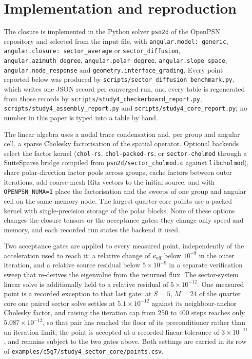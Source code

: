 \documentclass[11pt,a4paper]{article}
\newcommand{\keff}{\kappa_{\mathrm{eff}}}
\begin{document}
\section{Implementation and reproduction}
\label{sec:implementation}

The closure is implemented in the Python solver \texttt{psn2d} of the OpenPSN
repository and selected from the input file, with
\texttt{angular.model:\ generic}, \texttt{angular.closure:\ sector\_average} or
\texttt{sector\_diffusion}, \texttt{angular.azimuth\_degree},
\texttt{angular.polar\_degree}, \texttt{angular.slope\_space},
\texttt{angular.node\_response} and \texttt{geometry.interface\_grading}. Every point
reported below was produced by
\texttt{scripts/sector\_diffusion\_benchmark.py}, which writes one JSON record per
converged run, and every table is regenerated from those records by
\texttt{scripts/\allowbreak study4\_\allowbreak checkerboard\_\allowbreak report.py},
\texttt{scripts/\allowbreak study4\_\allowbreak assembly\_\allowbreak report.py} and
\texttt{scripts/\allowbreak study4\_\allowbreak core\_\allowbreak report.py}; no number
in this paper is typed into a table by hand.

The linear algebra uses a nodal trace condensation and, per group and angular cell, a
sparse Cholesky factorisation of the spatial operator. Optional backends select the
factor kernel (\texttt{chol-rs}, \texttt{chol-packed-rs}, or \texttt{sector-cholmod}
through a SuiteSparse bridge compiled from
\texttt{psn2d/sector\_cholmod.c} against \texttt{libcholmod}), share polar-direction
factor pools across groups, cache factors between outer iterations, add coarse-mesh
Ritz vectors to the initial source, and with \texttt{OPENPSN\_NUMA=1} place the
factorisation and the
sweeps of one group and angular cell on the same memory node. The largest quarter-core
points use a packed kernel with single-precision storage of the polar blocks. None of
these options changes the closure tensors or the acceptance gates: they change only
speed and memory, and each recorded run states the backend it used.

Two acceptance gates are applied to every measured point, independently of the
acceleration used to reach it: a relative change of $\keff$ below $10^{-9}$ in the
outer iteration, and a relative source residual below $5\times10^{-9}$ in a separate
verification sweep that re-derives the eigenvalue from the returned flux. The
sector-system linear solve is additionally held to a relative residual of
$5\times10^{-12}$. One measured point is a recorded exception to that last gate: at
$S{=}5$, $M{=}24$ of the quarter core one paired sector solve settles at
$5.1\times10^{-12}$ against its neighbour-anchor Cholesky factor, and raising the
iteration cap from 250 to 400 steps reaches only $5.087\times10^{-12}$, so that pair has
reached the floor of its preconditioner rather than an iteration limit; the point is
accepted at a recorded linear tolerance of $3\times10^{-11}$, and remains subject to the
two gates above. Both settings are carried in its row of
\texttt{examples/c5g7/study4\_sector\_core/points.csv}.
\end{document}
